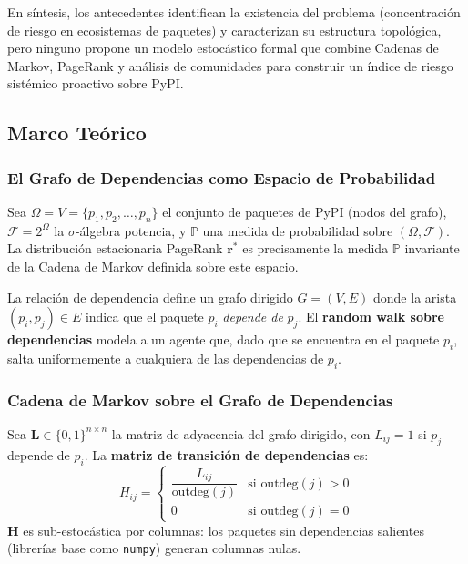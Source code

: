 En síntesis, los antecedentes identifican la existencia del problema 
(concentración de riesgo en ecosistemas de paquetes) y caracterizan 
su estructura topológica, pero ninguno propone un modelo estocástico 
formal que combine Cadenas de Markov, PageRank y análisis de comunidades 
para construir un índice de riesgo sistémico proactivo sobre PyPI.


\subsection{Marco Teórico}

\subsubsection{El Grafo de Dependencias como Espacio de Probabilidad}
Sea $\Omega = V = \{p_1, p_2, \ldots, p_n\}$ el conjunto de paquetes de PyPI
(nodos del grafo), $\mathcal{F} = 2^\Omega$ la $\sigma$-álgebra potencia, y
$\mathbb{P}$ una medida de probabilidad sobre $(\Omega, \mathcal{F})$. La
distribución estacionaria PageRank $\mathbf{r}^*$ es precisamente la medida
$\mathbb{P}$ invariante de la Cadena de Markov definida sobre este espacio.

La relación de dependencia define un grafo dirigido $G = (V, E)$ donde la arista
$(p_i, p_j) \in E$ indica que el paquete $p_i$ \textit{depende de} $p_j$.
El \textbf{random walk sobre dependencias} modela a un agente que, dado que se
encuentra en el paquete $p_i$, salta uniformemente a cualquiera de las
dependencias de $p_i$.

\subsubsection{Cadena de Markov sobre el Grafo de Dependencias}
\begin{definicion}
Sea $\mathbf{L} \in \{0,1\}^{n \times n}$ la matriz de adyacencia del grafo
dirigido, con $L_{ij}=1$ si $p_j$ depende de $p_i$. La \textbf{matriz de
transición de dependencias} es:
\[
    H_{ij} =
    \begin{cases}
        \dfrac{L_{ij}}{\text{outdeg}(j)} & \text{si } \text{outdeg}(j) > 0 \\[6pt]
        0 & \text{si } \text{outdeg}(j) = 0
    \end{cases}
\]
$\mathbf{H}$ es sub-estocástica por columnas: los paquetes sin dependencias
salientes (librerías base como \texttt{numpy}) generan columnas nulas.
\end{definicion}

